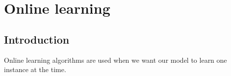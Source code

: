 \documentclass[journal]{IEEEtran/IEEEtran}
\begin{document}
\section{Online learning}
\subsection{Introduction}
Online learning algorithms are used when we want our model to learn one instance at the time.  




%
%


%
\end{document}
